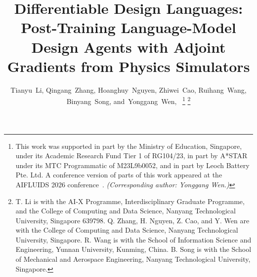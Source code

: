 \documentclass[journal]{IEEEtran}
\newif\ifblindreview
\begin{document}
\title{Differentiable Design Languages: Post-Training Language-Model Design Agents with Adjoint Gradients from Physics Simulators}

\ifblindreview
\author{Anonymous Authors}
\else
\author{Tianyu~Li,
        Qingang~Zhang,
        Hoanghuy~Nguyen,
        Zhiwei~Cao,
        Ruihang~Wang,
        Binyang~Song,
        and~Yonggang~Wen,~%
\thanks{This work was supported in part by the Ministry of Education, Singapore,
under its Academic Research Fund Tier 1 of RG104/23, in part by A*STAR under its
MTC Programmatic of M23L9b0052, and in part by Leoch Battery Pte. Ltd.
A conference version of parts of this work appeared at the AIFLUIDS 2026
conference~\cite{li2026dctwin}.  \emph{(Corresponding author: Yonggang Wen.)}}%
\thanks{T. Li is with the AI-X Programme, Interdisciplinary Graduate Programme, and the College of Computing and Data Science, Nanyang Technological University, Singapore 639798.  Q. Zhang, H. Nguyen, Z. Cao, and Y. Wen are with the College of Computing and Data Science, Nanyang Technological University, Singapore.  R. Wang is with the School of Information Science and Engineering, Yunnan University, Kunming, China.  B. Song is with the School of Mechanical and Aerospace Engineering, Nanyang Technological University, Singapore.}%

}
\fi

\ifblindreview
\markboth{IEEE Transactions on Neural Networks and Learning Systems}{Anonymous submission}
\else
{}
\fi

\maketitle
\end{document}
